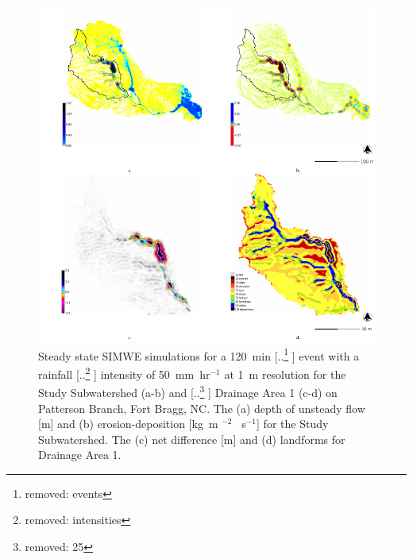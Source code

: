 \documentclass[gmd, manuscript]{copernicus}
\providecommand{\DIFadd}[1]{{\protect\color{blue} \sf #1}} %
\providecommand{\DIFdel}[1]{{\protect\color{red} [..\footnote{removed: #1} ]}} %
\providecommand{\DIFaddFL}[1]{\DIFadd{#1}} %
\providecommand{\DIFdelFL}[1]{\DIFdel{#1}} %
\providecommand{\DIFaddbeginFL}{} %
\providecommand{\DIFaddendFL}{} %
\providecommand{\DIFdelbeginFL}{} %
\providecommand{\DIFdelendFL}{} %
\begin{document}
\begin{figure}
\center
\includegraphics[width=\textwidth,height=0.95\textheight,keepaspectratio]{figures/simwe.pdf}
\caption{
Steady state SIMWE simulations 
for \DIFaddbeginFL \DIFaddFL{a }\DIFaddendFL 120~\unit{min} \DIFdelbeginFL \DIFdelFL{events }\DIFdelendFL \DIFaddbeginFL \DIFaddFL{event 
}\DIFaddendFL with \DIFaddbeginFL \DIFaddFL{a }\DIFaddendFL rainfall \DIFdelbeginFL \DIFdelFL{intensities }\DIFdelendFL \DIFaddbeginFL \DIFaddFL{intensity }\DIFaddendFL of 50~\unit{mm~hr}$^{-1}$
\DIFaddbeginFL \DIFaddFL{at 1~}\unit{m} \DIFaddFL{resolution for the
Study Subwatershed (a-b)
}\DIFaddendFL and \DIFdelbeginFL \DIFdelFL{25}\DIFdelendFL \DIFaddbeginFL \DIFaddFL{Drainage Area 1 (c-d)
on Patterson Branch, Fort Bragg, NC.
The (a) depth of unsteady flow }[\unit{m}] \DIFaddFL{and
(b) erosion-deposition }[\unit{kg~m}\DIFaddFL{$^{-2}$}\DIFaddendFL ~\DIFdelbeginFL %
\DIFdelendFL \DIFaddbeginFL \unit{s}\DIFaddendFL $^{-1}$\DIFaddbeginFL ]
\DIFaddFL{for the Study Subwatershed.
The (c) net difference }[\unit{m}] \DIFaddFL{and (d) landforms
for Drainage Area 1.
}\DIFaddendFL }
\DIFdelbeginFL %
\DIFdelendFL \DIFaddbeginFL \label{fig:simwe_simulation}
\DIFaddendFL \end{figure}
\end{document}
